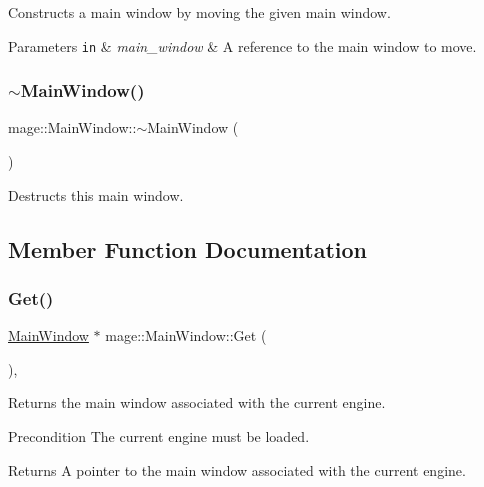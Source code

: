 Constructs a main window by moving the given main window.


\begin{DoxyParams}[1]{Parameters}
\mbox{\tt in}  & {\em main\+\_\+window} & A reference to the main window to move. \\
\hline
\end{DoxyParams}
\hypertarget{classmage_1_1_main_window_ada7ecf97d82ce08ba2f31f0afd891031}{}\label{classmage_1_1_main_window_ada7ecf97d82ce08ba2f31f0afd891031} 
\subsubsection{\texorpdfstring{$\sim$\+Main\+Window()}{~MainWindow()}}
{\footnotesize\ttfamily mage\+::\+Main\+Window\+::$\sim$\+Main\+Window (\begin{DoxyParamCaption}{ }\end{DoxyParamCaption})}

Destructs this main window. 

\subsection{Member Function Documentation}
\hypertarget{classmage_1_1_main_window_ab670605775c88e0121afa7a52ac88ddf}{}\label{classmage_1_1_main_window_ab670605775c88e0121afa7a52ac88ddf} 
\subsubsection{\texorpdfstring{Get()}{Get()}}
{\footnotesize\ttfamily \hyperlink{classmage_1_1_main_window}{Main\+Window} $\ast$ mage\+::\+Main\+Window\+::\+Get (\begin{DoxyParamCaption}{ }\end{DoxyParamCaption})\hspace{0.3cm}{\ttfamily [static]}, {\ttfamily [noexcept]}}

Returns the main window associated with the current engine.

\begin{DoxyPrecond}{Precondition}
The current engine must be loaded. 
\end{DoxyPrecond}
\begin{DoxyReturn}{Returns}
A pointer to the main window associated with the current engine. 
\end{DoxyReturn}
\hypertarget{classmage_1_1_main_window_ab4520f7c5ef0828535a117a8512221b5}{}\label{classmage_1_1_main_window_ab4520f7c5ef0828535a117a8512221b5} 
